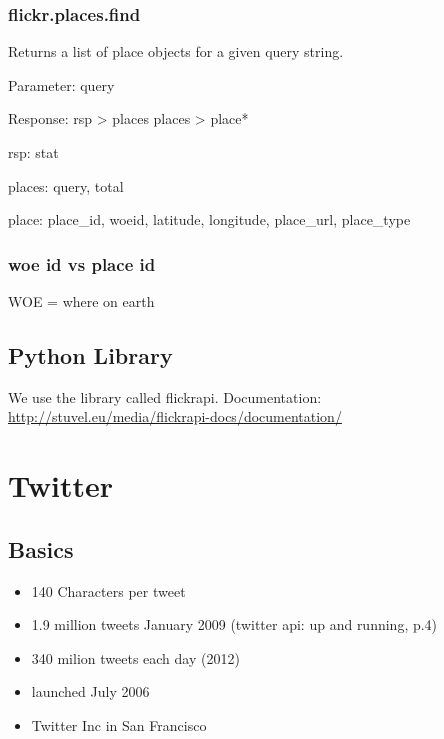 \documentclass[letterpaper,10pt,english]{sphinxmanual}
\begin{document}
\subsection{flickr.places.find}
\label{flickr:flickr-places-find}
Returns a list of place objects for a given query string.

Parameter: query

Response:
\textbar{} rsp \textgreater{} places
\textbar{} places \textgreater{} place*

\begin{DUlineblock}{0em}
\item[] rsp: stat
\item[] places: query, total
\item[] place: place\_id, woeid, latitude, longitude, place\_url, place\_type
\end{DUlineblock}


\subsection{woe id vs place id}
\label{flickr:woe-id-vs-place-id}
WOE = where on earth


\section{Python Library}
\label{flickr:python-library}
We use the library called flickrapi. Documentation: \href{http://stuvel.eu/media/flickrapi-docs/documentation/}{http://stuvel.eu/media/flickrapi-docs/documentation/}


\chapter{Twitter}
\label{twitter:twitter}\label{twitter::doc}

\section{Basics}
\label{twitter:basics}\begin{itemize}
\item {} 
140 Characters per tweet

\item {} 
1.9 million tweets January 2009 (twitter api: up and running, p.4)

\item {} 
340 milion tweets each day (2012)

\item {} 
launched July 2006

\item {} 
Twitter Inc in San Francisco

\end{itemize}
\end{document}
